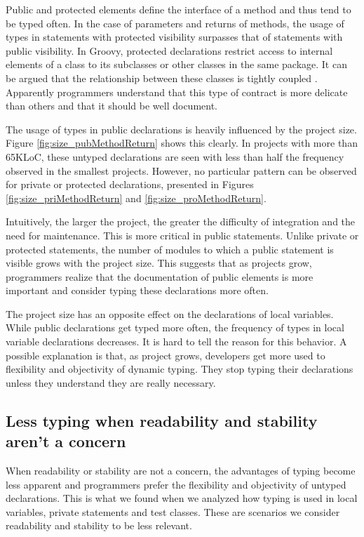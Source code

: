 \documentclass[preprint]{sigplanconf}
\begin{document}
Public and protected elements define the interface of a method and thus tend to be typed often.
In the case of parameters and returns of methods, the usage of types in statements with protected visibility  surpasses that of statements with public visibility.
In Groovy, protected declarations restrict access to internal elements of a class to its subclasses or other classes in the same package.
It can be argued that the relationship between these classes is tightly coupled \cite{Chidamber94}.
Apparently programmers understand that this type of contract is more delicate than others and that it should be well document.

The usage of types in public declarations is heavily influenced by the project size.
Figure \ref{fig:size_pubMethodReturn} shows this clearly.
In projects with more than 65KLoC, these untyped declarations are seen with less than half the frequency observed in the smallest projects.
However, no particular pattern can be observed for private or protected declarations, presented in Figures \ref{fig:size_priMethodReturn} and \ref{fig:size_proMethodReturn}.

Intuitively, the larger the project, the greater the difficulty of integration and the need for maintenance.
This is more critical in public statements.
Unlike private or protected statements, the number of modules to which a public statement is visible grows with the project size.
This suggests that as projects grow, programmers realize that the documentation of public elements is more important and consider typing these declarations more often.

The project size has an opposite effect on the declarations of local variables.
While public declarations get typed more often, the frequency of types in local variable declarations decreases.
It is hard to tell the reason for this behavior.
A possible explanation is that, as project grows, developers get more used to flexibility and objectivity of dynamic typing.
They stop typing their declarations unless they understand they are really necessary.

\subsection{Less typing when readability and stability aren't a concern\label{discussion-q2}}
When readability or stability are not a concern, the advantages of typing become less apparent and  programmers prefer the flexibility and objectivity of untyped declarations.
This is what we found when we analyzed how typing is used in local variables, private statements and test classes.
These are scenarios we consider readability and stability to be less relevant.
\end{document}
